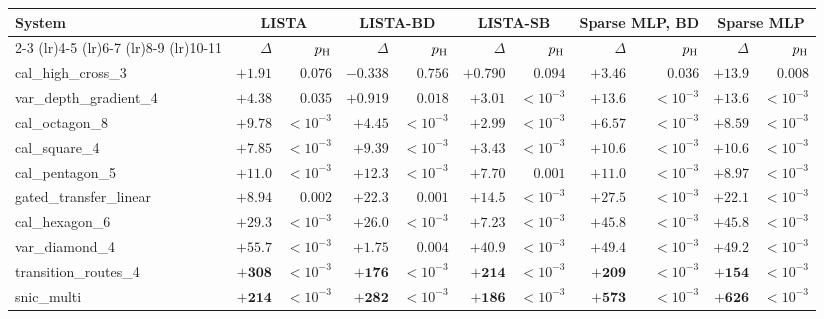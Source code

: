 \begin{tabular}{@{}l rr rr rr rr rr@{}}
\toprule
System & \multicolumn{2}{c}{LISTA} & \multicolumn{2}{c}{LISTA-BD} & \multicolumn{2}{c}{LISTA-SB} & \multicolumn{2}{c}{Sparse MLP, BD} & \multicolumn{2}{c}{Sparse MLP} \\
\cmidrule(lr){2-3} \cmidrule(lr){4-5} \cmidrule(lr){6-7} \cmidrule(lr){8-9} \cmidrule(lr){10-11}
 & $\Delta$ & $p_{\rm H}$ & $\Delta$ & $p_{\rm H}$ & $\Delta$ & $p_{\rm H}$ & $\Delta$ & $p_{\rm H}$ & $\Delta$ & $p_{\rm H}$ \\
\midrule
cal\_high\_cross\_3 & $+1.91$ & $0.076$ & $-0.338$ & $0.756$ & $+0.790$ & $0.094$ & $\mathbf{+3.46}$ & $0.036$ & $\mathbf{+13.9}$ & $0.008$ \\
var\_depth\_gradient\_4 & $\mathbf{+4.38}$ & $0.035$ & $\mathbf{+0.919}$ & $0.018$ & $\mathbf{+3.01}$ & $<\!10^{-3}$ & $\mathbf{+13.6}$ & $<\!10^{-3}$ & $\mathbf{+13.6}$ & $<\!10^{-3}$ \\
cal\_octagon\_8 & $\mathbf{+9.78}$ & $<\!10^{-3}$ & $\mathbf{+4.45}$ & $<\!10^{-3}$ & $\mathbf{+2.99}$ & $<\!10^{-3}$ & $\mathbf{+6.57}$ & $<\!10^{-3}$ & $\mathbf{+8.59}$ & $<\!10^{-3}$ \\
cal\_square\_4 & $\mathbf{+7.85}$ & $<\!10^{-3}$ & $\mathbf{+9.39}$ & $<\!10^{-3}$ & $\mathbf{+3.43}$ & $<\!10^{-3}$ & $\mathbf{+10.6}$ & $<\!10^{-3}$ & $\mathbf{+10.6}$ & $<\!10^{-3}$ \\
cal\_pentagon\_5 & $\mathbf{+11.0}$ & $<\!10^{-3}$ & $\mathbf{+12.3}$ & $<\!10^{-3}$ & $\mathbf{+7.70}$ & $0.001$ & $\mathbf{+11.0}$ & $<\!10^{-3}$ & $\mathbf{+8.97}$ & $<\!10^{-3}$ \\
gated\_transfer\_linear & $\mathbf{+8.94}$ & $0.002$ & $\mathbf{+22.3}$ & $0.001$ & $\mathbf{+14.5}$ & $<\!10^{-3}$ & $\mathbf{+27.5}$ & $<\!10^{-3}$ & $\mathbf{+22.1}$ & $<\!10^{-3}$ \\
cal\_hexagon\_6 & $\mathbf{+29.3}$ & $<\!10^{-3}$ & $\mathbf{+26.0}$ & $<\!10^{-3}$ & $\mathbf{+7.23}$ & $<\!10^{-3}$ & $\mathbf{+45.8}$ & $<\!10^{-3}$ & $\mathbf{+45.8}$ & $<\!10^{-3}$ \\
var\_diamond\_4 & $\mathbf{+55.7}$ & $<\!10^{-3}$ & $\mathbf{+1.75}$ & $0.004$ & $\mathbf{+40.9}$ & $<\!10^{-3}$ & $\mathbf{+49.4}$ & $<\!10^{-3}$ & $\mathbf{+49.2}$ & $<\!10^{-3}$ \\
transition\_routes\_4 & $\mathbf{+308}$ & $<\!10^{-3}$ & $\mathbf{+176}$ & $<\!10^{-3}$ & $\mathbf{+214}$ & $<\!10^{-3}$ & $\mathbf{+209}$ & $<\!10^{-3}$ & $\mathbf{+154}$ & $<\!10^{-3}$ \\
snic\_multi & $\mathbf{+214}$ & $<\!10^{-3}$ & $\mathbf{+282}$ & $<\!10^{-3}$ & $\mathbf{+186}$ & $<\!10^{-3}$ & $\mathbf{+573}$ & $<\!10^{-3}$ & $\mathbf{+626}$ & $<\!10^{-3}$ \\

\end{tabular}
